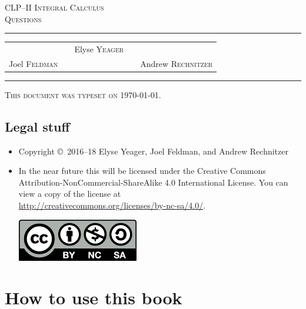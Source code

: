 \documentclass[12pt,letterpaper, openany]{book}
\begin{document}
\setcounter{page}{0}


\begin{titlepage}
\begin{center}
\textsc{\LARGE
CLP--II Integral Calculus \\[2ex]
Questions
}\\[2ex]

\vspace{5ex}
\hrule
\vspace{5ex}

\begin{tabular}{lcccr}
&& \large Elyse \textsc{Yeager} \\[3ex]
 Joel \textsc{Feldman}
&\quad & &\quad&
Andrew \textsc{Rechnitzer}
\end{tabular}

\end{center}
\vspace{2ex}
\hrule

\vfill
\textsc{This document was typeset on \today.}
\end{titlepage}

\section*{Legal stuff}
\begin{itemize}
 \item Copyright \copyright\ 2016--18 Elyse Yeager,  Joel Feldman,
and Andrew  Rechnitzer

\item In the near future this will be licensed under the
Creative Commons Attribution-NonCommercial-ShareAlike 4.0 International
License. You can view a copy of the license at \\
\url{http://creativecommons.org/licenses/by-nc-sa/4.0/}.
\begin{center}
 \includegraphics{figures/by-nc-sa.pdf}
\end{center}
\end{itemize}

\newpage

\frontmatter

\chapter{How to use this book}

\end{document}
